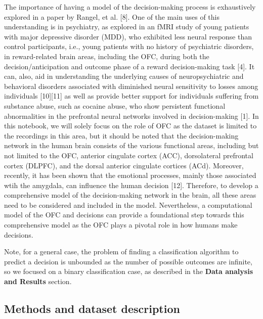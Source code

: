 \documentclass[11pt]{article}
\begin{document}
The importance of having a model of the decision-making process is
exhaustively explored in a paper by Rangel, et al. {[}8{]}. One of the
main uses of this understanding is in psychiatry, as explored in an fMRI
study of young patients with major depressive disorder (MDD), who
exhibited less neural response than control participants, i.e., young
patients with no history of psychiatric disorders, in reward-related
brain areas, including the OFC, during both the decision/anticipation
and outcome phase of a reward decision-making task {[}4{]}. It can,
also, aid in understanding the underlying causes of neuropsychiatric and
behavioral disorders associated with diminished neural sensitivity to
losses among individuals {[}10{]}{[}11{]} as well as provide better
support for individuals suffering from substance abuse, such as cocaine
abuse, who show persistent functional abnormalities in the prefrontal
neural networks involved in decision-making {[}1{]}. In this notebook,
we will solely focus on the role of OFC as the dataset is limited to the
recordings in this area, but it should be noted that the decision-making
network in the human brain consists of the various functional areas,
including but not limited to the OFC, anterior cingulate cortex (ACC),
dorsolateral prefrontal cortex (DLPFC), and the dorsal anterior
cingulate cortices (ACd). Moreover, recently, it has been shown that the
emotional processes, mainly those associated wtih the amygdala, can
influence the human decision {[}12{]}. Therefore, to develop a
comprehensive model of the decision-making network in the brain, all
these areas need to be considered and included in the model.
Nevertheless, a computational model of the OFC and decisions can provide
a foundational step towards this comprehensive model as the OFC plays a
pivotal role in how humans make decisions.

Note, for a general case, the problem of finding a classification
algorithm to predict a decision is unbounded as the number of possible
outcomes are infinite, so we focused on a binary classification case, as
described in the \textbf{Data analysis and Results} section.

    \hypertarget{methods-and-dataset-description}{%
\subsection{Methods and dataset
description}\label{methods-and-dataset-description}}
\end{document}
